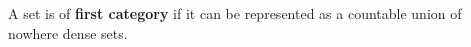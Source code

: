 A set is of \textbf{first category} if it can be represented as a countable union of nowhere dense sets.
